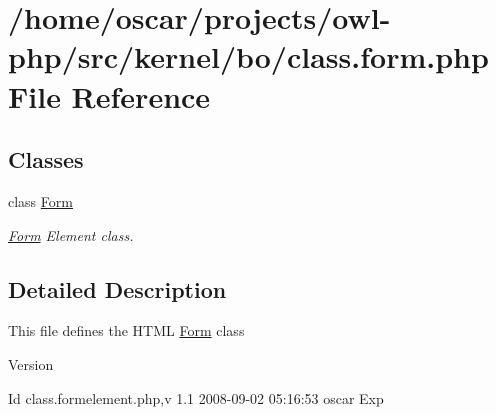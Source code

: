 \section{/home/oscar/projects/owl-\/php/src/kernel/bo/class.form.php File Reference}
\label{class_8form_8php}
\subsection*{Classes}
\begin{DoxyCompactItemize}
\item 
class \hyperlink{classForm}{Form}
\begin{DoxyCompactList}\small\item\em \hyperlink{classForm}{Form} Element class. \item\end{DoxyCompactList}\end{DoxyCompactItemize}


\subsection{Detailed Description}
This file defines the HTML \hyperlink{classForm}{Form} class \begin{DoxyVersion}{Version}

\end{DoxyVersion}
\begin{DoxyParagraph}{Id}
class.formelement.php,v 1.1 2008-\/09-\/02 05:16:53 oscar Exp 
\end{DoxyParagraph}
